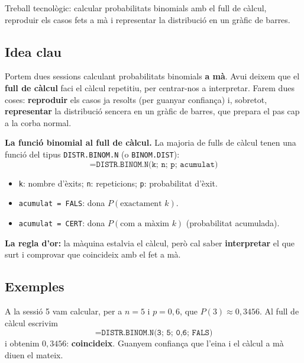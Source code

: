 %
{Treball tecnològic: calcular probabilitats binomials amb el full de càlcul, reproduir els casos fets a mà i representar la distribució en un gràfic de barres.}

\subsection{Idea clau}

Portem dues sessions calculant probabilitats binomials \textbf{a mà}. Avui deixem que el
\textbf{full de càlcul} faci el càlcul repetitiu, per centrar-nos a interpretar. Farem
dues coses: \textbf{reproduir} els casos ja resolts (per guanyar confiança) i, sobretot,
\textbf{representar} la distribució sencera en un gràfic de barres, que prepara el pas cap
a la corba normal.

\begin{idea}
\textbf{La funció binomial al full de càlcul.} La majoria de fulls de càlcul tenen una
funció del tipus \texttt{DISTR.BINOM.N} (o \texttt{BINOM.DIST}):
\[
\texttt{=DISTR.BINOM.N(k;\ n;\ p;\ acumulat)}
\]
\begin{itemize}[leftmargin=1.4em, itemsep=2pt]
  \item \texttt{k}: nombre d'èxits; \texttt{n}: repeticions; \texttt{p}: probabilitat
        d'èxit.
  \item \texttt{acumulat = FALS}: dona $P(\text{exactament }k)$.
  \item \texttt{acumulat = CERT}: dona $P(\text{com a màxim }k)$ (probabilitat acumulada).
\end{itemize}
\textbf{La regla d'or:} la màquina estalvia el càlcul, però cal saber \textbf{interpretar}
el que surt i comprovar que coincideix amb el fet a mà.
\end{idea}

\subsection{Exemples}

\begin{exemple}
A la sessió 5 vam calcular, per a $n=5$ i $p=0,6$, que $P(3)\approx 0,3456$. Al full de
càlcul escrivim
\[
\texttt{=DISTR.BINOM.N(3;\ 5;\ 0,6;\ FALS)}
\]
i obtenim $0,3456$: \textbf{coincideix}. Guanyem confiança que l'eina i el càlcul a mà
diuen el mateix.
\end{exemple}

